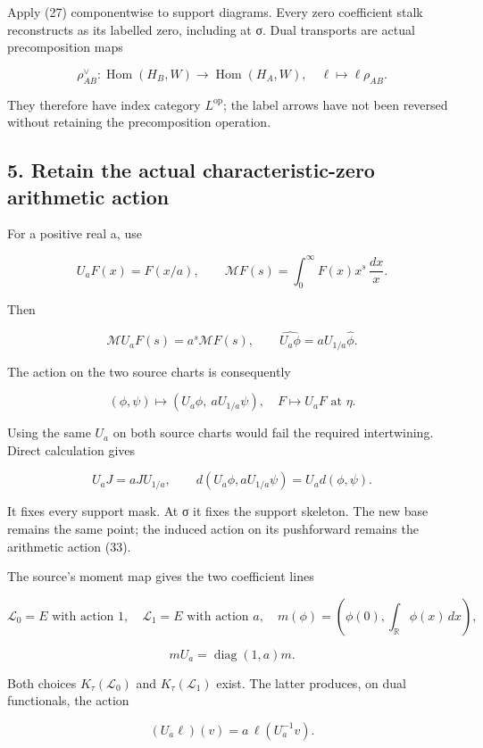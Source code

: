 \documentclass[
]{article}
\begin{document}
Apply (27) componentwise to support diagrams. Every zero coefficient
stalk reconstructs as its labelled zero, including at σ. Dual transports
are actual precomposition maps

\[
\rho_{AB}^{\vee}:\operatorname{Hom}(H_B,W)\longrightarrow
\operatorname{Hom}(H_A,W),\quad\ell\mapsto\ell\rho_{AB}.
\tag{31}
\]

They therefore have index category \(L^{\mathrm{op}}\); the label arrows
have not been reversed without retaining the precomposition operation.

\subsection{5. Retain the actual characteristic-zero arithmetic
action}\label{retain-the-actual-characteristic-zero-arithmetic-action}

For a positive real a, use

\[
U_aF(x)=F(x/a),\qquad
\mathcal M F(s)=\int_0^\infty F(x)x^s\,\frac{dx}{x}.
\tag{32}
\]

Then

\[
\mathcal M U_aF(s)=a^s\mathcal MF(s),\qquad
\widehat{U_a\phi}=aU_{1/a}\widehat\phi.
\tag{33}
\]

The action on the two source charts is consequently

\[
(\phi,\psi)\longmapsto(U_a\phi,\ aU_{1/a}\psi),
\quad
F\longmapsto U_aF\text{ at }\eta.
\tag{34}
\]

Using the same \(U_a\) on both source charts would fail the required
intertwining. Direct calculation gives

\[
U_aJ=aJU_{1/a},\qquad d(U_a\phi,aU_{1/a}\psi)=U_a d(\phi,\psi).
\tag{35}
\]

It fixes every support mask. At σ it fixes the support skeleton. The new
base remains the same point; the induced action on its pushforward
remains the arithmetic action (33).

The source's moment map gives the two coefficient lines

\[
\mathcal L_0=E\text{ with action }1,\quad
\mathcal L_1=E\text{ with action }a,
\quad
m(\phi)=(\phi(0),\int_{\mathbb R}\phi(x)\,dx),
\tag{36}
\]

\[
mU_a=\operatorname{diag}(1,a)m.
\]

Both choices \(K_\tau(\mathcal L_0)\) and \(K_\tau(\mathcal L_1)\)
exist. The latter produces, on dual functionals, the action

\[
(U_a\ell)(v)=a\,\ell(U_a^{-1}v).
\tag{37}
\]
\end{document}
